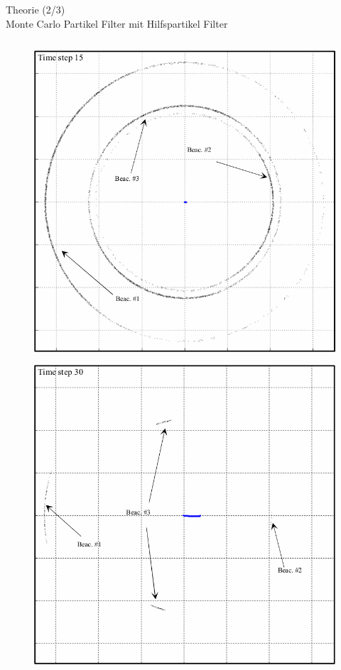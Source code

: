 \documentclass{beamer}
\begin{document}
\begin{frame}{Theorie (2/3)\\Monte Carlo Partikel Filter mit Hilfspartikel Filter}
\begin{columns}
\begin{overlayarea}{\textwidth}{.9\textheight}
{\begin{figure}
						\includegraphics[width=\linewidth]{blanco2008pure_fig3f}
						\caption{\cite{blanco2008pure}}
					\end{figure}
				}
				{
					\begin{figure}
						\centering
						\includegraphics[width=\linewidth]{blanco2008pure_fig3g}

\end{figure}}
\end{overlayarea}
\end{columns}
\end{frame}
\end{document}
